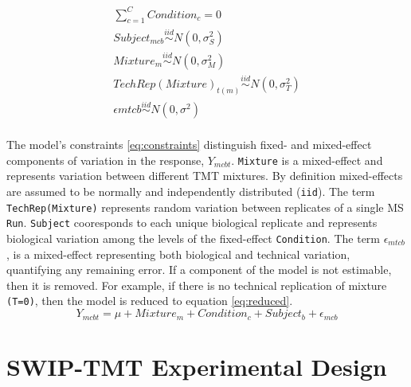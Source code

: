 \documentclass[11pt]{elife}\usepackage[]{graphicx}\usepackage[]{color}
\begin{document}
\begin{equation}
  \begin{gathered}
    \label{eq:constraints}
	\sum_{c=1}^{C} Condition_c = 0 \\
	Subject_{mcb} \stackrel{iid}{\sim} N(0,\sigma^2_S) \\
	Mixture_m \stackrel{iid}{\sim} N(0,\sigma^2_M) \\
	TechRep(Mixture)_{t(m)} \stackrel{iid}{\sim} N(0,\sigma^2_T) \\
	\epsilon{mtcb} \stackrel{iid}{\sim} N(0,\sigma^2) \\
  \end{gathered}
\end{equation}

The model's constraints \ref{eq:constraints} distinguish fixed- and mixed-effect
components of variation in the response, $Y_{mcbt}$. \texttt{Mixture} is a
mixed-effect and represents variation between different TMT mixtures. By definition
mixed-effects are assumed to be normally and independently distributed (\texttt{iid}). 
The term \texttt{TechRep(Mixture)} represents random variation between
replicates of a single MS \texttt{Run}. \texttt{Subject} cooresponds
to each unique biological replicate and represents biological variation among
the levels of the fixed-effect \texttt{Condition}. The term
$\epsilon_{mtcb}$, is a mixed-effect representing both biological and technical
variation, quantifying any remaining error. If a component of the model is not
estimable, then it is removed.  For example, if there is no technical
replication of mixture \texttt{(T=0)}, 
then the model is reduced to equation \ref{eq:reduced}.
\begin{equation} %
	\label{eq:reduced} %
	Y_{mcbt} = \mu + Mixture_m + Condition_c + Subject_b + \epsilon_{mcb}
\end{equation}


\section{SWIP-TMT Experimental Design}
\end{document}
